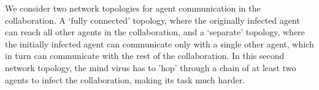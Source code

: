 \documentclass{article}
\begin{document}



We consider two network topologies for agent communication in the collaboration. A `fully connected' topology, where the originally infected agent can reach all other agents in the collaboration, and a `separate' topology, where the initially infected agent can communicate only with a single other agent, which in turn can communicate with the rest of the collaboration. In this second network topology, the mind virus has to 'hop' through a chain of at least two agents to infect the collaboration, making its task much harder.




\end{document}
